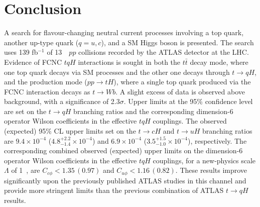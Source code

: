 \section{Conclusion}
\label{sec:conclusion}
A search for flavour-changing neutral current processes involving a top quark, another up-type quark ($q=u, c$), and a SM Higgs boson is presented. 
The search uses 139 fb$^{-1}$ of 13~\TeV\ $pp$ collisions recorded by the ATLAS detector at the LHC.
Evidence of FCNC $tqH$ interactions is sought in both the $t\bar{t}$ decay mode, where one top quark decays via SM processes and the other one decays through $t\rightarrow qH$, and the production mode ($pp\rightarrow tH$), where a single top quark produced via the
FCNC interaction decays as $t\to Wb$.
A slight excess of data is observed above background, with a significance of 2.3$\sigma$. Upper limits at the
95\% confidence level are set on the $t\to qH$ branching ratios and the corresponding
dimension-6 operator Wilson coefficients in the effective $tqH$ couplings. 
The observed (expected) 95\% CL upper limits set on the $t\to cH$ and $t\to uH$ branching ratios are $9.4\times10^{-4}$ ($4.8^{+2.2}_{-1.4}\times10^{-4}$) and $6.9\times10^{-4}$ ($3.5^{+1.5}_{-1.0}\times10^{-4}$), respectively.
The corresponding combined observed (expected) upper limits on the dimension-6 operator Wilson coefficients in
the effective $tqH$ couplings, for a new-physics scale $\Lambda$ of 1~\TeV, are $C_{c\phi} <1.35\, (0.97)$ and $C_{u\phi} <1.16\, (0.82)$.
These results improve significantly upon the previously published ATLAS studies in this channel and provide more stringent limits than the previous combination of ATLAS  $t\rightarrow qH$ results.
